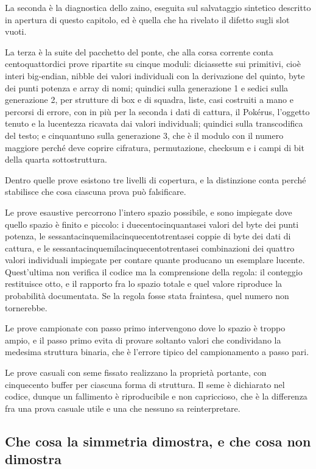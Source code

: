 La seconda è la diagnostica dello zaino, eseguita sul salvataggio sintetico descritto in apertura di questo capitolo, ed è quella che ha rivelato il difetto sugli slot vuoti.

La terza è la suite del pacchetto del ponte, che alla corsa corrente conta centoquattordici prove ripartite su cinque moduli: diciassette sui primitivi, cioè interi big-endian, nibble dei valori individuali con la derivazione del quinto, byte dei punti potenza e array di nomi; quindici sulla generazione 1 e sedici sulla generazione 2, per strutture di box e di squadra, liste, casi costruiti a mano e percorsi di errore, con in più per la seconda i dati di cattura, il Pokérus, l'oggetto tenuto e la lucentezza ricavata dai valori individuali; quindici sulla transcodifica del testo; e cinquantuno sulla generazione 3, che è il modulo con il numero maggiore perché deve coprire cifratura, permutazione, checksum e i campi di bit della quarta sottostruttura.

Dentro quelle prove esistono tre livelli di copertura, e la distinzione conta perché stabilisce che cosa ciascuna prova può falsificare.

Le prove esaustive percorrono l'intero spazio possibile, e sono impiegate dove quello spazio è finito e piccolo: i duecentocinquantasei valori del byte dei punti potenza, le sessantacinquemilacinquecentotrentasei coppie di byte dei dati di cattura, e le sessantacinquemilacinquecentotrentasei combinazioni dei quattro valori individuali impiegate per contare quante producano un esemplare lucente. Quest'ultima non verifica il codice ma la comprensione della regola: il conteggio restituisce otto, e il rapporto fra lo spazio totale e quel valore riproduce la probabilità documentata. Se la regola fosse stata fraintesa, quel numero non tornerebbe.

Le prove campionate con passo primo intervengono dove lo spazio è troppo ampio, e il passo primo evita di provare soltanto valori che condividano la medesima struttura binaria, che è l'errore tipico del campionamento a passo pari.

Le prove casuali con seme fissato realizzano la proprietà portante, con cinquecento buffer per ciascuna forma di struttura. Il seme è dichiarato nel codice, dunque un fallimento è riproducibile e non capriccioso, che è la differenza fra una prova casuale utile e una che nessuno sa reinterpretare.

\subsection{Che cosa la simmetria dimostra, e che cosa non dimostra}

